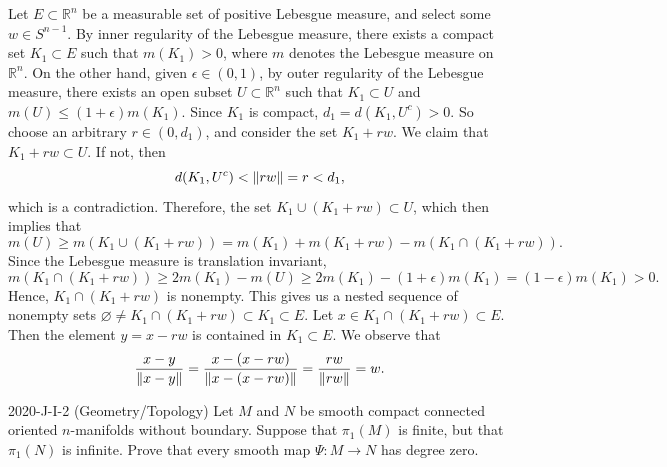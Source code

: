 \documentclass{article}
\begin{document}
\begin{solutions}
	Let $E \subset \mathbb{R}^{n}$ be a measurable set of positive Lebesgue measure, and select some $w \in S^{n - 1}$. By inner regularity of the Lebesgue measure, there exists a compact set $K_{1} \subset E$ such that $m(K_{1}) > 0$, where $m$ denotes the Lebesgue measure on $\mathbb{R}^{n}$. On the other hand, given $\epsilon \in (0,1)$, by outer regularity of the Lebesgue measure, there exists an open subset $U \subset \mathbb{R}^{n}$ such that $K_{1} \subset U$ and $m(U) \leq (1 + \epsilon)m(K_{1})$. Since $K_{1}$ is compact, $d_{1} = d(K_{1}, U^{c}) > 0$. So choose an arbitrary $r \in (0, d_{1})$, and consider the set $K_{1} + rw$. We claim that $K_{1} + rw \subset U$. If not, then 
		\begin{equation}
			d(K_{1}, U^{c}) < \left\Vert rw \right\Vert = r < d_{1}, 
		\end{equation}
	which is a contradiction. Therefore, the set $K_{1} \cup (K_{1} + rw) \subset U$, which then implies that 	
		\begin{equation}
			m(U) \geq m(K_{1} \cup (K_{1} + rw)) = m(K_{1}) + m(K_{1} + rw) - m(K_{1} \cap (K_{1} + rw)). 
		\end{equation}
	Since the Lebesgue measure is translation invariant, 
		\begin{equation}
			m(K_{1} \cap (K_{1} + rw)) \geq 2m(K_{1}) - m(U) \geq 2m(K_{1}) - (1 + \epsilon)m(K_{1}) = (1 - \epsilon)m(K_{1}) > 0. 
		\end{equation}
	Hence, $K_{1} \cap (K_{1} + rw)$ is nonempty. This gives us a nested sequence of nonempty sets $\varnothing \neq K_{1} \cap (K_{1} + rw) \subset K_{1} \subset E$. Let $x \in K_{1} \cap (K_{1} + rw) \subset E$. Then the element $y = x - rw$ is contained in $K_{1} \subset E$. We observe that 
		\begin{equation}
			\frac{x - y}{\left\Vert x - y \right\Vert} = \frac{x - (x - rw)}{\left\Vert x - (x - rw) \right\Vert} = \frac{rw}{\left\Vert rw \right\Vert} = w. 
		\end{equation}
\end{solutions}
\begin{prb}{2020-J-I-2 (Geometry/Topology)}
	Let $M$ and $N$ be smooth compact connected oriented $n$-manifolds without boundary. Suppose that $\pi_{1}(M)$ is finite, but that $\pi_{1}(N)$ is infinite. Prove that every smooth map $\Psi: M \to N$ has degree zero. 
\end{prb}
\end{document}
